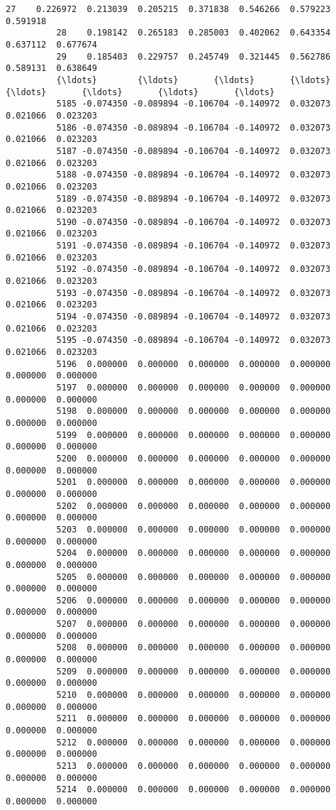 \documentclass[11pt]{article}
\begin{document}
\begin{Verbatim}[commandchars=\\\{\}]
          27    0.226972  0.213039  0.205215  0.371838  0.546266  0.579223  0.591918   
          28    0.198142  0.265183  0.285003  0.402062  0.643354  0.637112  0.677674   
          29    0.185403  0.229757  0.245749  0.321445  0.562786  0.589131  0.638649   
          {\ldots}        {\ldots}       {\ldots}       {\ldots}       {\ldots}       {\ldots}       {\ldots}       {\ldots}   
          5185 -0.074350 -0.089894 -0.106704 -0.140972  0.032073  0.021066  0.023203   
          5186 -0.074350 -0.089894 -0.106704 -0.140972  0.032073  0.021066  0.023203   
          5187 -0.074350 -0.089894 -0.106704 -0.140972  0.032073  0.021066  0.023203   
          5188 -0.074350 -0.089894 -0.106704 -0.140972  0.032073  0.021066  0.023203   
          5189 -0.074350 -0.089894 -0.106704 -0.140972  0.032073  0.021066  0.023203   
          5190 -0.074350 -0.089894 -0.106704 -0.140972  0.032073  0.021066  0.023203   
          5191 -0.074350 -0.089894 -0.106704 -0.140972  0.032073  0.021066  0.023203   
          5192 -0.074350 -0.089894 -0.106704 -0.140972  0.032073  0.021066  0.023203   
          5193 -0.074350 -0.089894 -0.106704 -0.140972  0.032073  0.021066  0.023203   
          5194 -0.074350 -0.089894 -0.106704 -0.140972  0.032073  0.021066  0.023203   
          5195 -0.074350 -0.089894 -0.106704 -0.140972  0.032073  0.021066  0.023203   
          5196  0.000000  0.000000  0.000000  0.000000  0.000000  0.000000  0.000000   
          5197  0.000000  0.000000  0.000000  0.000000  0.000000  0.000000  0.000000   
          5198  0.000000  0.000000  0.000000  0.000000  0.000000  0.000000  0.000000   
          5199  0.000000  0.000000  0.000000  0.000000  0.000000  0.000000  0.000000   
          5200  0.000000  0.000000  0.000000  0.000000  0.000000  0.000000  0.000000   
          5201  0.000000  0.000000  0.000000  0.000000  0.000000  0.000000  0.000000   
          5202  0.000000  0.000000  0.000000  0.000000  0.000000  0.000000  0.000000   
          5203  0.000000  0.000000  0.000000  0.000000  0.000000  0.000000  0.000000   
          5204  0.000000  0.000000  0.000000  0.000000  0.000000  0.000000  0.000000   
          5205  0.000000  0.000000  0.000000  0.000000  0.000000  0.000000  0.000000   
          5206  0.000000  0.000000  0.000000  0.000000  0.000000  0.000000  0.000000   
          5207  0.000000  0.000000  0.000000  0.000000  0.000000  0.000000  0.000000   
          5208  0.000000  0.000000  0.000000  0.000000  0.000000  0.000000  0.000000   
          5209  0.000000  0.000000  0.000000  0.000000  0.000000  0.000000  0.000000   
          5210  0.000000  0.000000  0.000000  0.000000  0.000000  0.000000  0.000000   
          5211  0.000000  0.000000  0.000000  0.000000  0.000000  0.000000  0.000000   
          5212  0.000000  0.000000  0.000000  0.000000  0.000000  0.000000  0.000000   
          5213  0.000000  0.000000  0.000000  0.000000  0.000000  0.000000  0.000000   
          5214  0.000000  0.000000  0.000000  0.000000  0.000000  0.000000  0.000000   
          

\end{Verbatim}
\end{document}

